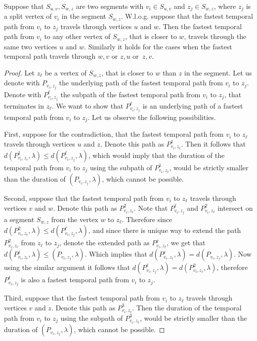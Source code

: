 \documentclass[a4paper,UKenglish,cleveref, autoref, thm-restate, anonymous]{lipics-v2021}
\begin{document}
\begin{lemma}\label{lemma:FPT-unlabeldPaths-01}
    Suppose that
    $S_{u,v}, S_{w,z}$ are two segments with $ v_i \in S_{u,v}$ and $z_j \in S_{w,z}$,
    where $z_j$ is a split vertex of $v_i$ in the segment $S_{w,z}$.
    W.l.o.g. suppose that the fastest temporal path from $v_i$ to $z_j$ travels through vertices $u$ and $w$.
    Then the fastest temporal path from $v_i$ to any other vertex of $S_{w,z}$, that is closer to $w$,
    travels through the same two vertices $u$ and $w$.
    Similarly it holds for the cases when the fastest temporal path travels through $w,v$ or $z,u$ or~$z,v$.
\end{lemma}
\begin{proof}
    Let $z_\ell$ be a vertex of $S_{w,z}$, that is closer to $w$ than $z$ in the segment.
    Let us denote with $P_{v_i,z_j}$ the underlying path of the fastest temporal path from $v_i$ to $z_j$.
    Denote with $P_{v_i,z_j}^\ell$
    the subpath of the fastest temporal path from $v_i$ to $z_j$, that terminates in $z_\ell$.
    We want to show that $P_{v_i,z_j}^\ell$ is an underlying path of a fastest temporal path from $v_i$ to $z_j$.
    Let us observe the following possibilities.
 
    First, suppose for the contradiction, that the fastest temporal path from $v_i$ to $z_\ell$ travels through vertices $u$ and $z$.
    Denote this path as $P^1_{v_i,z_\ell}$.
    Then it follows that $d(P^1_{v_i,z_\ell}, \lambda) \leq d(P_{v_i,z_j}^\ell,\lambda)$, which would imply that
    the duration of the temporal path from $v_i$ to $z_j$ using the subpath of $P^1_{v_i,z_\ell}$, would be strictly smaller than the duration of $(P_{v_i,z_j},\lambda)$, which cannot be possible.
 
    Second, suppose that the fastest temporal path from $v_i$ to $z_\ell$ travels through vertices $v$ and $w$.
    Denote this path as $P^2_{v_i,z_\ell}$.
    Note that $P_{v_i,z_j}^\ell$ and $P^2_{v_i,z_\ell}$ intersect on a segment $S_{w,z}$ from the vertex $w$ to $z_\ell$.
    Therefore since
    $d(P^2_{v_i,z_\ell}, \lambda) \leq d(P_{v_i,z_j}^\ell,\lambda)$,
    and since there is unique way to
    extend the path $P^2_{v_i,z_\ell}$ from $z_\ell$ to $z_j$, denote the extended path as $P^j_{v_i,z_\ell}$,
    we get that $d(P^j_{v_i,z_\ell}, \lambda) \leq $$(P_{v_i,z_j},\lambda)$.
    Which implies that $d(P^j_{v_i,z_\ell}, \lambda) = d(P_{v_i,z_j}, \lambda)$.
    Now using the similar argument it follows that $d(P_{v_i,z_j}^\ell, \lambda) = d(P^2_{v_i,z_\ell}, \lambda)$,
    therefore $P_{v_i,z_j}^\ell$ is also a fastest temporal path from $v_i$ to $z_j$.
 
    Third, suppose that the fastest temporal path from $v_i$ to $z_\ell$ travels through vertices $v$ and $z$.
    Denote this path as $P^3_{v_i,z_\ell}$.
    Then the duration of the temporal path from $v_i$ to $z_j$ using the subpath of $P^3_{v_i,z_\ell}$, would be strictly smaller than the duration of $(P_{v_i,z_j},\lambda)$, which cannot be possible.
\end{proof}
\end{document}
